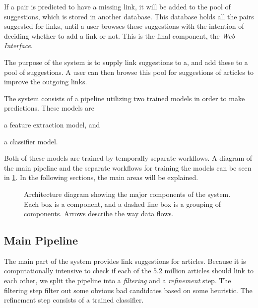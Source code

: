 If a pair is predicted to have a missing link, it will be added to the pool of suggestions, which is stored in another database. This database holds all the pairs suggested for links, until a user browses these suggestions with the intention of deciding whether to add a link or not. This is the final component, the \emph{Web Interface}.




The purpose of the system is to supply link suggestions to a, and add these to a pool of suggestions. A user can then browse this pool for suggestions of articles to improve the outgoing links.

The system consists of a pipeline utilizing two trained models in order to make predictions. These models are
\begin{enumerate*}[label=(\roman*)]
  \item a feature extraction model, and
  \item a classifier model.
\end{enumerate*}
Both of these models are trained by temporally separate workflows. A diagram of the main pipeline and the separate workflows for training the models can be seen in \cref{fig:system-overview}. In the following sections, the main areas will be explained.

\begin{figure}[tb]%
  \centering
  
\caption[Architecture diagram showing the major components of the system]{Architecture diagram showing the major components of the system. Each box is a component, and a dashed line box is a grouping of components. Arrows describe the way data flows.}%
\label{fig:system-overview}%
\end{figure}



\subsection{Main Pipeline}
The main part of the system provides link suggestions for articles. Because it is computationally intensive to check if each of the 5.2 million articles should link to each other, we split the pipeline into a \emph{filtering} and a \emph{refinement} step. The filtering step filter out some obvious bad candidates based on some heuristic. The refinement step consists of a trained classifier.

